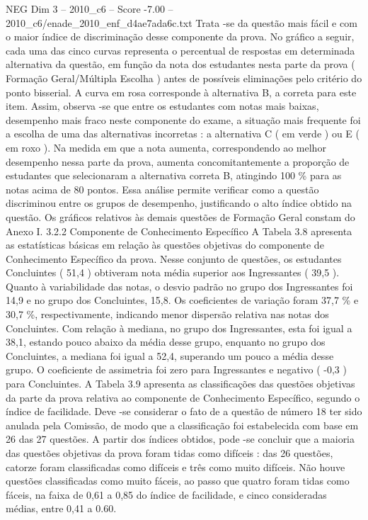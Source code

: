 \begin{textsample}{NEG Dim 3 – 2010\_c6 – Score -7.00 – 2010\_c6/enade\_2010\_enf\_d4ae7ada6c.txt}
Trata -se da questão mais fácil e com o maior índice de discriminação desse componente da prova.
No gráfico a seguir, cada uma das cinco curvas representa o percentual de respostas em determinada alternativa da questão, em função da nota dos estudantes nesta parte da prova ( Formação Geral/Múltipla Escolha ) antes de possíveis eliminações pelo critério do ponto bisserial.
A curva em rosa corresponde à alternativa B, a correta para este item.
Assim, observa -se que entre os estudantes com notas mais baixas, desempenho mais fraco neste componente do exame, a situação mais frequente foi a escolha de uma das alternativas incorretas : a alternativa C ( em verde ) ou E ( em roxo ).
Na medida em que a nota aumenta, correspondendo ao melhor desempenho nessa parte da prova, aumenta concomitantemente a proporção de estudantes que selecionaram a alternativa correta B, atingindo 100 \% para as notas acima de 80 pontos.
Essa análise permite verificar como a questão discriminou entre os grupos de desempenho, justificando o alto índice obtido na questão.
Os gráficos relativos às demais questões de Formação Geral constam do Anexo I. 3.2.2 Componente de Conhecimento Específico A Tabela 3.8 apresenta as estatísticas básicas em relação às questões objetivas do componente de Conhecimento Específico da prova.
Nesse conjunto de questões, os estudantes Concluintes ( 51,4 ) obtiveram nota média superior aos Ingressantes ( 39,5 ).
Quanto à variabilidade das notas, o desvio padrão no grupo dos Ingressantes foi 14,9 e no grupo dos Concluintes, 15,8.
Os coeficientes de variação foram 37,7 \% e 30,7 \%, respectivamente, indicando menor dispersão relativa nas notas dos Concluintes.
Com relação à mediana, no grupo dos Ingressantes, esta foi igual a 38,1, estando pouco abaixo da média desse grupo, enquanto no grupo dos Concluintes, a mediana foi igual a 52,4, superando um pouco a média desse grupo.
O coeficiente de assimetria foi zero para Ingressantes e negativo ( -0,3 ) para Concluintes.
A Tabela 3.9 apresenta as classificações das questões objetivas da parte da prova relativa ao componente de Conhecimento Específico, segundo o índice de facilidade.
Deve -se considerar o fato de a questão de número 18 ter sido anulada pela Comissão, de modo que a classificação foi estabelecida com base em 26 das 27 questões.
A partir dos índices obtidos, pode -se concluir que a maioria das questões objetivas da prova foram tidas como difíceis : das 26 questões, catorze foram classificadas como difíceis e três como muito difíceis.
Não houve questões classificadas como muito fáceis, ao passo que quatro foram tidas como fáceis, na faixa de 0,61 a 0,85 do índice de facilidade, e cinco consideradas médias, entre 0,41 a 0.60.

\end{textsample}
